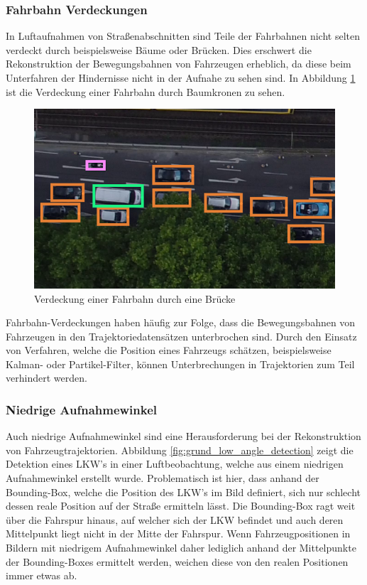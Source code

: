 \subsubsection*{Fahrbahn Verdeckungen}

In Luftaufnahmen von Straßenabschnitten sind Teile der Fahrbahnen nicht selten verdeckt durch beispielsweise
Bäume oder Brücken. Dies erschwert die Rekonstruktion der Bewegungsbahnen von Fahrzeugen erheblich, da diese
beim Unterfahren der Hindernisse nicht in der Aufnahe zu sehen sind. In Abbildung \ref{fig:grund_lane_occlusion}
ist die Verdeckung einer Fahrbahn durch Baumkronen zu sehen.

\begin{figure}[H]
    \centering
    \includegraphics[width=0.45\linewidth]{resources/img/grundlagen/TrajectoryReconstruction/challenges/Verdeckung}
    \caption[Fahrbahn Verdeckung]{Verdeckung einer Fahrbahn durch eine Brücke}
    \label{fig:grund_lane_occlusion}
\end{figure}

Fahrbahn-Verdeckungen haben häufig zur Folge, dass die Bewegungsbahnen von Fahrzeugen in den
Trajektoriedatensätzen unterbrochen sind.
Durch den Einsatz von Verfahren, welche die Position eines Fahrzeugs schätzen, beispielsweise
Kalman- oder Partikel-Filter, können Unterbrechungen in Trajektorien zum Teil verhindert werden.

\subsubsection*{Niedrige Aufnahmewinkel}

Auch niedrige Aufnahmewinkel sind eine Herausforderung bei der Rekonstruktion von Fahrzeugtrajektorien.
Abbildung \ref{fig:grund_low_angle_detection} zeigt die Detektion eines LKW's in einer Luftbeobachtung,
welche aus einem niedrigen Aufnahmewinkel erstellt wurde. Problematisch ist hier, dass anhand der Bounding-Box,
welche die Position des LKW's im Bild definiert, sich nur schlecht dessen reale Position auf der Straße ermitteln lässt.
Die Bounding-Box ragt weit über die Fahrspur hinaus, auf welcher sich der LKW befindet und auch deren Mittelpunkt
liegt nicht in der Mitte der Fahrspur. Wenn Fahrzeugpositionen in Bildern mit niedrigem Aufnahmewinkel daher lediglich
anhand der Mittelpunkte der Bounding-Boxes ermittelt werden, weichen diese von den realen Positionen immer etwas ab.

